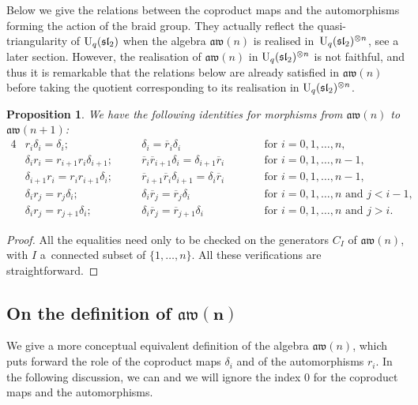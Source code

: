 \documentclass[pdftex]{sigma}
\numberwithin{equation}{section}
\newtheorem{prop}[theo]{Proposition}
\theoremstyle{definition}
\newcommand{\rb}{\overline{r}}
\newcommand{\aw}{\mathfrak{aw}(n)}
\begin{document}
Below we give the relations between the coproduct maps and the automorphisms forming the action of the braid group. They actually reflect the quasi-triangularity of ${\rm U}_q(\mathfrak{sl}_2)$ when the algebra $\aw$ is realised
in~${\rm U}_q(\mathfrak{sl}_2)^{\otimes n}$, see a later section. However, the realisation of $\aw$ in ${\rm U}_q(\mathfrak{sl}_2)^{\otimes n}$ is not faithful, and thus it is remarkable that the relations below are already satisfied in $\aw$
before taking the quotient corresponding to its realisation in ${\rm U}_q(\mathfrak{sl}_2)^{\otimes n}$.
\begin{prop}\label{prop-r-delta}
We have the following identities for morphisms from $\aw$ to $\mathfrak{aw}(n+1)$:
\begin{alignat*}{4}%
&r_i\delta_i=\delta_i; &&\quad \delta_i=\rb_i\delta_i && \quad\text{for $i=0,1,\dots,n$,} &\\
&\delta_ir_i=r_{i+1}r_i\delta_{i+1}; &&\quad \rb_i\rb_{i+1}\delta_i=\delta_{i+1}\rb_i \quad && \quad\text{for $i=0,1,\dots,n-1$,} &\\
&\delta_{i+1}r_i=r_{i}r_{i+1}\delta_{i}; &&\quad \rb_{i+1}\rb_i\delta_{i+1}=\delta_{i}\rb_i && \quad\text{for $i=0,1,\dots,n-1$,} &\\
&\delta_ir_j=r_j\delta_i; &&\quad \delta_i\rb_j=\rb_j\delta_i && \quad\text{for $i=0,1,\dots,n$ and $j<i-1$,} &\\
&\delta_ir_j=r_{j+1}\delta_i; &&\quad \delta_i\rb_j=\rb_{j+1}\delta_i && \quad\text{for $i=0,1,\dots,n$ and $j>i$.} &
\end{alignat*}
\end{prop}
\begin{proof}
All the equalities need only to be checked on the generators $C_I$ of $\aw$, with $I$ a~connected subset of $\{1,\dots,n\}$. All these verifications are straightforward.
\end{proof}

\subsection[On the definition of aw(n)]{On the definition of $\boldsymbol{\aw}$}\label{sect:aw3-n}
We give a more conceptual equivalent definition of the algebra $\aw$, which puts forward the role of the coproduct maps $\delta_i$ and of the automorphisms $r_i$. In the following discussion, we can and we will ignore the index $0$ for the coproduct maps and the automorphisms.
\end{document}
